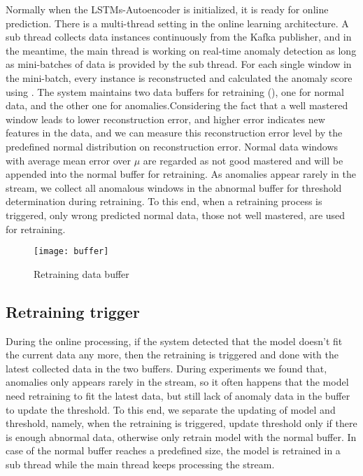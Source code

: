 Normally when the LSTMs-Autoencoder is initialized, it is ready for online prediction. There is a multi-thread setting in the online learning architecture. A sub thread collects data instances continuously from the Kafka publisher, and in the meantime, the main thread is working on real-time anomaly detection as long as mini-batches of data is provided by the sub thread. For each single window in the mini-batch, every instance is reconstructed and calculated the anomaly score using . The system maintains two data buffers for retraining (), one for normal data, and the other one for anomalies.Considering the fact that a well mastered window leads to lower reconstruction error, and higher error indicates new features in the data, and we can measure this reconstruction error level by the predefined normal distribution on reconstruction error. Normal data windows with average mean error over $\mu$ are regarded as not good mastered and will be appended into the normal buffer for retraining. As anomalies appear rarely in the stream, we collect all anomalous windows in the abnormal buffer for threshold determination during retraining. To this end, when a retraining process is triggered, only wrong predicted normal data, those not well mastered, are used for retraining.

\begin{figure}[h]
\centering
\texttt{[image: buffer]}
\caption[Retraining data buffer]{Retraining data buffer}
\label{fig:buffer}
\end{figure}


\subsection{Retraining trigger}
\label{trigger}

During the online processing, if the system detected that the model doesn’t fit the current data any more, then the retraining is triggered and done with the latest collected data in the two buffers. During experiments we found that, anomalies only appears rarely in the stream, so it often happens that the model need retraining to fit the latest data, but still lack of anomaly data in the buffer to update the threshold. To this end, we separate the updating of model and threshold, namely, when the retraining is triggered, update threshold only if there is enough abnormal data, otherwise only retrain model with the normal buffer. In case of the normal buffer reaches a predefined size, the model is retrained in a sub thread while the main thread keeps processing the stream. 

